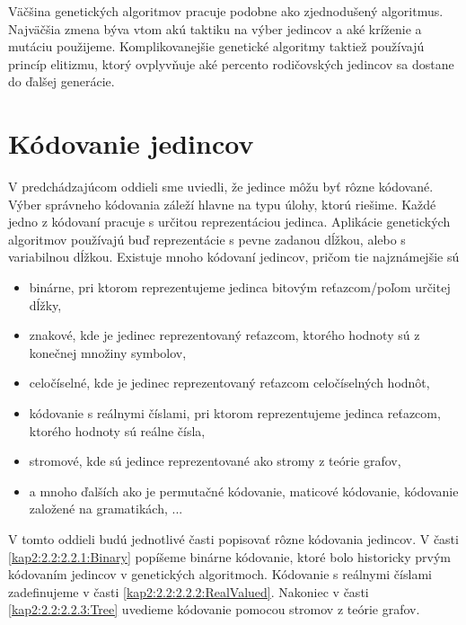 Väčšina genetických algoritmov pracuje podobne ako zjednodušený algoritmus. Najväčšia zmena býva vtom akú taktiku na výber jedincov a aké kríženie a mutáciu použijeme. Komplikovanejšie genetické algoritmy taktiež používajú princíp elitizmu, ktorý ovplyvňuje aké percento rodičovských jedincov sa dostane do ďalšej generácie.

\section{Kódovanie jedincov}\label{kap2:2.2:Coding}
V predchádzajúcom oddieli sme uviedli, že jedince môžu byť rôzne kódované. Výber správneho kódovania záleží hlavne na typu úlohy, ktorú riešime. Každé jedno z kódovaní pracuje s určitou reprezentáciou jedinca. Aplikácie genetických algoritmov používajú buď reprezentácie s pevne zadanou dĺžkou, alebo s variabilnou dĺžkou. Existuje mnoho kódovaní jedincov, pričom tie najznámejšie sú
\begin{itemize}
\item binárne, pri ktorom reprezentujeme jedinca bitovým reťazcom/poľom určitej dĺžky,
\item znakové, kde je jedinec reprezentovaný reťazcom, ktorého hodnoty sú z konečnej množiny symbolov,
\item celočíselné, kde je jedinec reprezentovaný reťazcom celočíselných hodnôt,
\item kódovanie s reálnymi číslami, pri ktorom reprezentujeme jedinca reťazcom, ktorého hodnoty sú reálne čísla,
\item stromové, kde sú jedince reprezentované ako stromy z teórie grafov,
\item a mnoho ďalších ako je permutačné kódovanie, maticové kódovanie, kódovanie založené na gramatikách, ...
\end{itemize} 

V tomto oddieli budú jednotlivé časti popisovať rôzne kódovania jedincov. V časti \ref{kap2:2.2:2.2.1:Binary} popíšeme binárne kódovanie, ktoré bolo historicky prvým kódovaním jedincov v genetických algoritmoch. Kódovanie s reálnymi číslami zadefinujeme v časti \ref{kap2:2.2:2.2.2:RealValued}. Nakoniec v časti \ref{kap2:2.2:2.2.3:Tree} uvedieme kódovanie pomocou stromov z teórie grafov.
